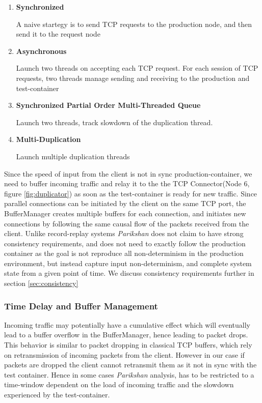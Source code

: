 \begin{enumerate}

  \item \textbf{Synchronized}

  A naive startegy is to send TCP requests to the production node, and then send it to the request node

  \item \textbf{Asynchronous}

Launch two threads on accepting each TCP request. For each session of TCP requests, two threads manage sending and receiving  to the production and test-container

  \item \textbf{Synchronized Partial Order Multi-Threaded Queue}

Launch two threads, track slowdown of the duplication thread.

  \item \textbf{Multi-Duplication}

Launch multiple duplication threads

\end{enumerate}

Since the speed of input from the client is not in sync production-container, we need to buffer incoming traffic and relay it to the the TCP Connector(Node 6, figure \ref{fig:duplicator}) as soon as the test-container is ready for new traffic. 
Since parallel connections can be initiated by the client on the same TCP port, the BufferManager creates multiple buffers for each connection, and initiates new connections by following the same causal flow of the packets received from the client. 
Unlike record-replay systems \textit{Parikshan} does not claim to have strong consistency requirements, and does not need to exactly follow the production container as the goal is not reproduce all non-determinism in the production environment, but instead capture input non-determinism, and complete system state from a given point of time.
We discuss consistency requirements further in section \ref{sec:consistency}

\subsubsection{Time Delay and Buffer Management}
\label{sec:TimeManagement}

Incoming traffic may potentially have a cumulative effect which will eventually lead to a buffer overflow in the BufferManager, hence leading to packet drops. 
This behavior is similar to packet dropping in classical TCP buffers, which rely on retransmission of incoming packets from the client.
However in our case if packets are dropped the client cannot retransmit them as it not in sync with the test container.
Hence in some cases \textit{Parikshan} analysis, has to be restricted to a time-window dependent on the load of incoming traffic and the slowdown experienced by the test-container.

